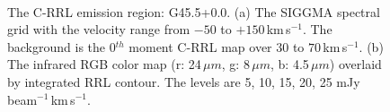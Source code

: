 \documentclass[manuscript]{aastex61}
\newcommand{\kms}{\,km\,s$^{-1}$}
\newcommand{\um}{\mu m}
\begin{document}
\begin{figure}[H]
	\centering
	\\ 
	\caption{The C-RRL emission region: G45.5+0.0.
	(a) The SIGGMA spectral grid with the velocity range from $-50$ to $+150$\kms.
	The background is the 0$^{th}$ moment C-RRL map over $30$ to $70$\kms.
	(b) The infrared RGB color map (r: 24\,$\um$, g: 8\,$\um$, b: 4.5\,$\um$) overlaid by integrated RRL contour.
	The levels are 5, 10, 15, 20, 25 mJy\,beam$^{-1}$\kms.}
	\label{fig_crrl-g455}
\end{figure}
\end{document}
